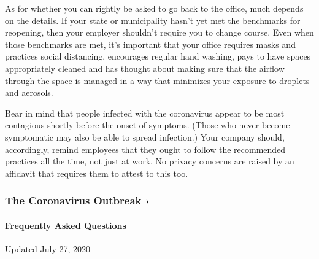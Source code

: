 As for whether you can rightly be asked to go back to the office, much
depends on the details. If your state or municipality hasn't yet met the
benchmarks for reopening, then your employer shouldn't require you to
change course. Even when those benchmarks are met, it's important that
your office requires masks and practices social distancing, encourages
regular hand washing, pays to have spaces appropriately cleaned and has
thought about making sure that the airflow through the space is managed
in a way that minimizes your exposure to droplets and aerosols.

Bear in mind that people infected with the coronavirus appear to be most
contagious shortly before the onset of symptoms. (Those who never become
symptomatic may also be able to spread infection.) Your company should,
accordingly, remind employees that they ought to follow the recommended
practices all the time, not just at work. No privacy concerns are raised
by an affidavit that requires them to attest to this too.

\href{https://www.nytimes.com/news-event/coronavirus?action=click\&pgtype=Article\&state=default\&region=MAIN_CONTENT_3\&context=storylines_faq}{}

\hypertarget{the-coronavirus-outbreak-}{%
\subsubsection{The Coronavirus Outbreak
›}\label{the-coronavirus-outbreak-}}

\hypertarget{frequently-asked-questions}{%
\paragraph{Frequently Asked
Questions}\label{frequently-asked-questions}}

Updated July 27, 2020

